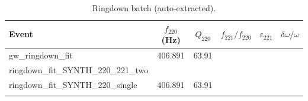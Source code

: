 \begin{longtable}{lccccc}
\toprule
Event & $f_{220}$ (Hz) & $Q_{220}$ & $f_{221}/f_{220}$ & $\varepsilon_{221}$ & $\delta\omega/\omega$ \\
\midrule
\endhead
gw\_ringdown\_fit & 406.891 & 63.91 &  &  &  \\
ringdown\_fit\_SYNTH\_220\_221\_two &  &  &  &  &  \\
ringdown\_fit\_SYNTH\_220\_single & 406.891 & 63.91 &  &  &  \\
\bottomrule
\caption{Ringdown batch (auto‐extracted).}
\label{tab:ringdown-batch}
\end{longtable}
